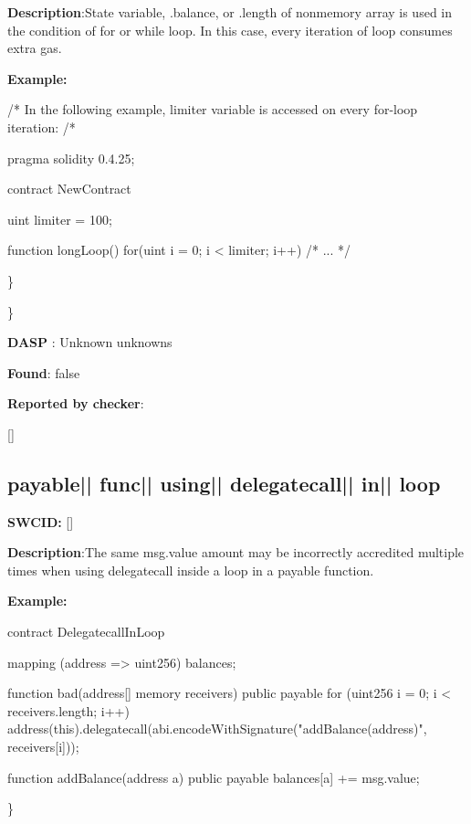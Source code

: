 \documentclass{article}
\begin{document}
\textbf{Description}:State variable, .balance, or .length of non{\textendash}memory array is used in the condition of for or while loop. In this case, every iteration of loop consumes extra gas.


\textbf{Example:} 
\begin{ffcode} 

/* In the following example, limiter variable is accessed on every for-loop iteration: /* 

pragma solidity 0.4.25;

contract NewContract {
    uint limiter = 100;

    function longLoop() {
        for(uint i = 0; i < limiter; i++) {
            /* ... */
        }
    }
}

\end{ffcode} 
\} 

\} 

\textbf{DASP} : Unknown unknowns

\textbf{Found}: false

\textbf{Reported by checker}: 
\begin{ffcode} 

[]
\end{ffcode} 
\subsection{payable{|\textunderscore| }func{|\textunderscore| }using{|\textunderscore| }delegatecall{|\textunderscore| }in{|\textunderscore| }loop} 
\textbf{SWC{\textunderscore }ID:} []

\textbf{Description}:The same msg.value amount may be incorrectly accredited multiple times when using delegatecall inside a loop in a payable function.


\textbf{Example:} 
\begin{ffcode} 

contract DelegatecallInLoop{

    mapping (address => uint256) balances;

    function bad(address[] memory receivers) public payable {
        for (uint256 i = 0; i < receivers.length; i++) {
            address(this).delegatecall(abi.encodeWithSignature("addBalance(address)", receivers[i]));
        }
    }

    function addBalance(address a) public payable {
        balances[a] += msg.value;
    }
}

\end{ffcode} 
\} 
\end{document}
